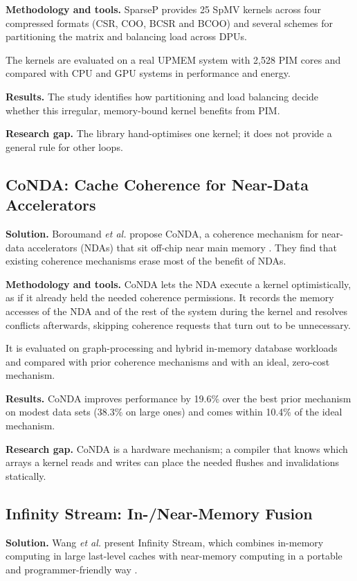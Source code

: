 \documentclass{ieeeaccess}
\begin{document}
\textbf{Methodology and tools.} SparseP provides 25 SpMV kernels across four compressed formats (CSR, COO, BCSR and BCOO) and several schemes for partitioning the matrix and balancing load across DPUs.

The kernels are evaluated on a real UPMEM system with 2,528 PIM cores and compared with CPU and GPU systems in performance and energy.

\textbf{Results.} The study identifies how partitioning and load balancing decide whether this irregular, memory-bound kernel benefits from PIM.

\textbf{Research gap.} The library hand-optimises one kernel; it does not provide a general rule for other loops.

\subsection{CoNDA: Cache Coherence for Near-Data Accelerators}
\textbf{Solution.} Boroumand \emph{et al.} propose CoNDA, a coherence mechanism for near-data accelerators (NDAs) that sit off-chip near main memory \cite{boroumand2019conda}. They find that existing coherence mechanisms erase most of the benefit of NDAs.

\textbf{Methodology and tools.} CoNDA lets the NDA execute a kernel optimistically, as if it already held the needed coherence permissions. It records the memory accesses of the NDA and of the rest of the system during the kernel and resolves conflicts afterwards, skipping coherence requests that turn out to be unnecessary.

It is evaluated on graph-processing and hybrid in-memory database workloads and compared with prior coherence mechanisms and with an ideal, zero-cost mechanism.

\textbf{Results.} CoNDA improves performance by 19.6\% over the best prior mechanism on modest data sets (38.3\% on large ones) and comes within 10.4\% of the ideal mechanism.

\textbf{Research gap.} CoNDA is a hardware mechanism; a compiler that knows which arrays a kernel reads and writes can place the needed flushes and invalidations statically.

\subsection{Infinity Stream: In-/Near-Memory Fusion}
\textbf{Solution.} Wang \emph{et al.} present Infinity Stream, which combines in-memory computing in large last-level caches with near-memory computing in a portable and programmer-friendly way \cite{wang2023infinity}.
\end{document}
